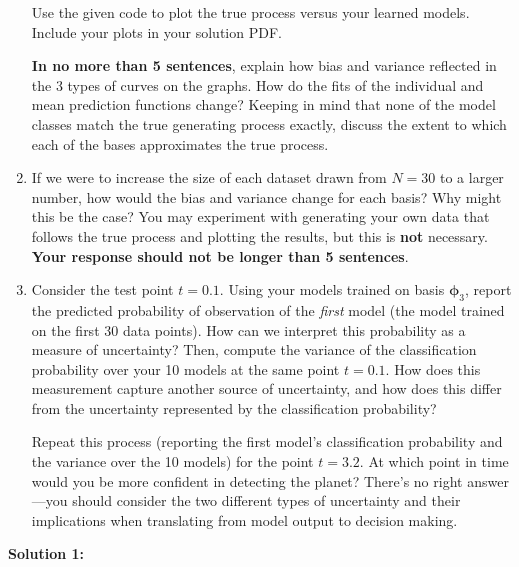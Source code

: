 \documentclass[submit]{harvardml}
\begin{document}
\begin{problem}
\begin{enumerate}
Use the given code to plot the true process versus your learned models. Include your plots in your solution PDF.

\textbf{In no more than 5 sentences}, explain how bias and variance reflected in the 3 types of curves on the graphs.  How do the fits of the individual and mean prediction functions change?  Keeping in mind that none of the model classes match the true generating process exactly, discuss the extent to which each of the bases approximates the true process.

\item If we were to increase the size of each dataset drawn from $N = 30$ to a larger number, how would the bias and variance change for each basis? Why might this be the case? You may experiment with generating your own data that follows the true process and plotting the results, but this is \textbf{not} necessary. \textbf{Your response should not be longer than 5 sentences}.

\item Consider the test point $t = 0.1$. Using your models trained on basis $\boldsymbol\phi_3$, report the predicted probability of observation of the \textit{first} model (the model trained on the first 30 data points). How can we interpret this probability as a measure of uncertainty? Then, compute the variance of the classification probability over your 10 models at the same point $t = 0.1$. How does this measurement capture another source of uncertainty, and how does this differ from the uncertainty represented by the classification probability?

Repeat this process (reporting the first model's classification probability and the variance over the 10 models) for the point $t = 3.2$. At which point in time would you be more confident in detecting the planet? There's no right answer---you should consider the two different types of uncertainty and their implications when translating from model output to decision making.

\end{enumerate}
\end{problem}
 \let\cleardoublepage\clearpage

\newpage

\textbf{Solution 1:}
\end{document}
